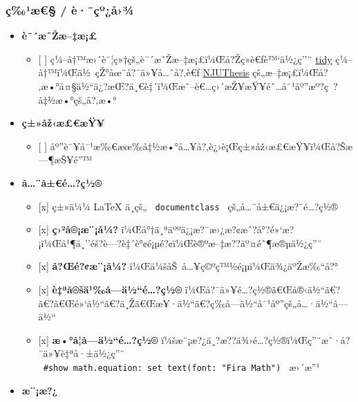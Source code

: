 \subsubsection{ç‰¹æ€§ /
è·¯çº¿å›¾}\label{uxe7uxb9uxe6-uxe8uxe7uxbauxe5uxbe}

\begin{itemize}
\tightlist
\item
  \textbf{è¯´æ˜Žæ--‡æ¡£}

  \begin{itemize}
  \tightlist
  \item
    {[} {]} ç¼--å†™æ›´è¯¦ç»†çš„è¯´æ˜Žæ--‡æ¡£ï¼Œå?Žç»­è€ƒè™`ä½¿ç''¨
    \href{https://github.com/typst/packages/tree/main/packages/preview/tidy/0.1.0}{tidy}
    ç¼--å†™ï¼Œä½~çŽ°åœ¨å?¯ä»¥å\ldots ˆå?‚è€ƒ
    \href{https://mirror-hk.koddos.net/CTAN/macros/unicodetex/latex/njuthesis/njuthesis.pdf}{NJUThesis}
    çš„æ--‡æ¡£ï¼Œå?‚æ•°å¤§ä½``ä¿?æŒ?ä¸€è‡´ï¼Œæˆ--è€\ldots ç›´æŽ¥æŸ¥é˜\ldots å¯¹åº''æº?ç~?å‡½æ•°çš„å?‚æ•°
  \end{itemize}
\item
  \textbf{ç±»åž‹æ£€æŸ¥}

  \begin{itemize}
  \tightlist
  \item
    {[} {]}
    åº''è¯¥å¯¹æ‰€æœ‰å‡½æ•°å\ldots¥å?‚è¿›è¡Œç±»åž‹æ£€æŸ¥ï¼Œå?Šæ---¶æŠ¥é''™
  \end{itemize}
\item
  \textbf{å\ldots¨å±€é\ldots?ç½®}

  \begin{itemize}
  \tightlist
  \item
    {[}x{]} ç±»ä¼¼ LaTeX ä¸­çš„ \texttt{\ documentclass\ }
    çš„å\ldots¨å±€ä¿¡æ?¯é\ldots?ç½®
  \item
    {[}x{]} \textbf{ç›²å®¡æ¨¡å¼?}
    ï¼Œå°†ä¸ªäººä¿¡æ?¯æ›¿æ?¢æˆ?å°?é»`æ?¡ï¼Œå¹¶ä¸''éš?è---?è‡´è°¢é¡µé?¢ï¼Œè®ºæ--‡æ??äº¤é˜¶æ®µä½¿ç''¨
  \item
    {[}x{]} \textbf{å?Œé?¢æ¨¡å¼?}
    ï¼Œä¼šåŠ~å\ldots¥ç©ºç™½é¡µï¼Œä¾¿äºŽæ‰``å?°
  \item
    {[}x{]} \textbf{è‡ªå®šä¹‰å­---ä½``é\ldots?ç½®}
    ï¼Œå?¯ä»¥é\ldots?ç½®ã€Œå®‹ä½``ã€?ã€?ã€Œé»`ä½``ã€?ä¸Žã€Œæ¥·ä½``ã€?ç­‰å­---ä½``å¯¹åº''çš„å\ldots·ä½``å­---ä½``
  \item
    {[}x{]} \textbf{æ•°å­¦å­---ä½``é\ldots?ç½®}
    ï¼šæ¨¡æ?¿ä¸?æ??ä¾›é\ldots?ç½®ï¼Œç''¨æˆ·å?¯ä»¥è‡ªå·±ä½¿ç''¨
    \texttt{\ \#show\ math.equation:\ set\ text(font:\ "Fira\ Math")\ }
    æ›´æ''¹
  \end{itemize}
\item
  \textbf{æ¨¡æ?¿}


\end{itemize}

